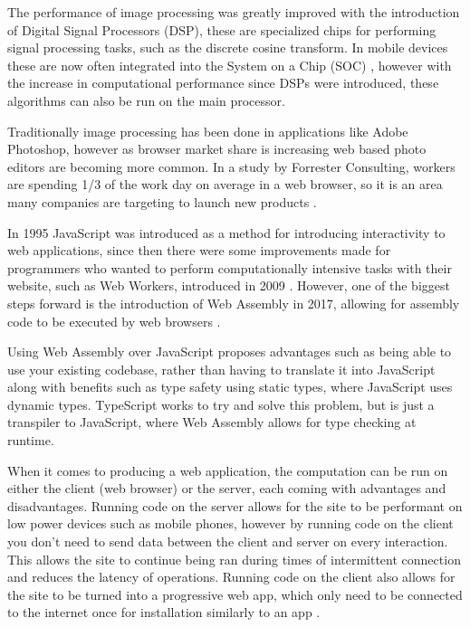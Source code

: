 \documentclass[12pt,a4paper]{article}
\begin{document}
The performance of image processing was greatly improved with the introduction of Digital Signal Processors (DSP), these are specialized chips for performing signal processing tasks, such as the discrete cosine transform. In mobile devices these are now often integrated into the System on a Chip (SOC) \cite{angoletta2008digital}, however with the increase in computational performance since DSPs were introduced, these algorithms can also be run on the main processor.

Traditionally image processing has been done in applications like Adobe Photoshop, however as browser market share is increasing web based photo editors are becoming more common. In a study by Forrester Consulting, workers are spending 1/3 of the work day on average in a web browser, so it is an area many companies are targeting to launch new products \cite{cloud_worker}.


In 1995 JavaScript was introduced as a method for introducing interactivity to web applications, since then there were some improvements made for programmers who wanted to perform computationally intensive tasks with their website, such as Web Workers, introduced in 2009 \cite{Hickson}. However, one of the biggest steps forward is the introduction of Web Assembly in 2017, allowing for assembly code to be executed by web browsers \cite{haas2017bringing}.

Using Web Assembly over JavaScript proposes advantages such as being able to use your existing codebase, rather than having to translate it into JavaScript along with benefits such as type safety using static types, where JavaScript uses dynamic types. TypeScript works to try and solve this problem, but is just a transpiler to JavaScript, where Web Assembly allows for type checking at runtime.

When it comes to producing a web application, the computation can be run on either the client (web browser) or the server, each coming with advantages and disadvantages. Running code on the server allows for the site to be performant on low power devices such as mobile phones, however by running code on the client you don't need to send data between the client and server on every interaction. This allows the site to continue being ran during times of intermittent connection and reduces the latency of operations. Running code on the client also allows for the site to be turned into a progressive web app, which only need to be connected to the internet once for installation similarly to an app \cite{biorn2017progressive}.
\end{document}

